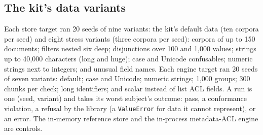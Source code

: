\subsection{The kit's data variants}\label{app:kit}

Each store target ran 20 seeds of nine variants: the kit's default data (ten corpora per seed) and
eight stress variants (three corpora per seed): corpora of up to 150 documents; filters nested six
deep; disjunctions over 100 and 1,000 values; strings up to 40,000 characters (long and huge);
case and Unicode confusables; numeric strings next to integers; and unusual field names. Each engine
target ran 20 seeds of seven variants: default; case and Unicode; numeric strings; 1,000 groups;
300 chunks per check; long identifiers; and scalar instead of list ACL fields. A run is one (seed,
variant) and takes its worst subject's outcome: pass, a conformance violation, a refusal by the
library (a \texttt{ValueError} for data it cannot represent), or an error. The in-memory reference
store and the in-process metadata-ACL engine are controls.
